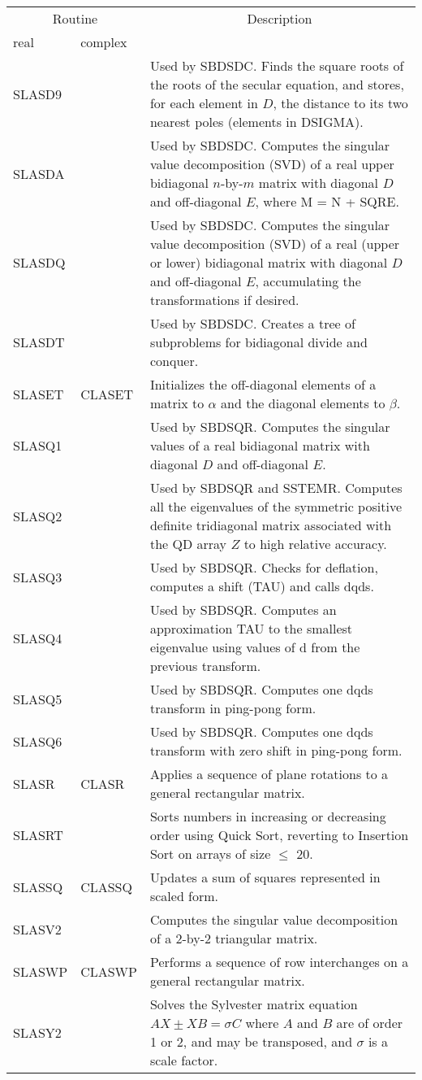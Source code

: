 \begin{center}
\begin{tabular}{| l   p{1.15in} |p{4.1in}    |}
\hline \multicolumn{2}{|c|}{Routine}&\multicolumn{1}{c|}{Description} \\ 
\cline{1-2} real&complex&\\
\hline \hline
SLASD9&&
Used by SBDSDC.  Finds the square roots of the roots of the secular
equation, and stores, for each element in $D$, the distance to its two
nearest poles (elements in DSIGMA). \\
SLASDA&&
Used by SBDSDC.  Computes the singular value decomposition (SVD) of a
real upper bidiagonal $n$-by-$m$ matrix with diagonal $D$ and off-diagonal $E$,
where M = N + SQRE. \\
SLASDQ&&
Used by SBDSDC.  Computes the singular value decomposition (SVD) of a real
(upper or lower) bidiagonal matrix with diagonal $D$ and
off-diagonal $E$, accumulating the transformations if desired. \\
SLASDT&&
Used by SBDSDC.  Creates a tree of subproblems for bidiagonal divide and
conquer.\\
SLASET&CLASET& 
Initializes the off-diagonal elements of a matrix to $\alpha$
and the diagonal elements to $\beta$.\\
SLASQ1& &
Used by SBDSQR.
Computes the singular values of a real bidiagonal
matrix with diagonal $D$ and off-diagonal $E$.   \\
SLASQ2& &
Used by SBDSQR and SSTEMR.
Computes all the eigenvalues of the symmetric positive
definite tridiagonal matrix associated with the QD array $Z$ to high
relative accuracy.\\ 
SLASQ3& &
Used by SBDSQR.
Checks for deflation, computes a shift (TAU) and calls dqds.\\
SLASQ4& &
Used by SBDSQR.
Computes an approximation TAU to the smallest eigenvalue
using values of d from the previous transform.\\
SLASQ5& &
Used by SBDSQR.
Computes one dqds transform in ping-pong form. \\
SLASQ6& &
Used by SBDSQR.
Computes one dqds transform with zero shift in ping-pong form. \\
SLASR&CLASR&
Applies a sequence of plane rotations to a general rectangular
matrix.\\
SLASRT& &
Sorts numbers in increasing or decreasing order using Quick Sort,
reverting to Insertion Sort on arrays of size $\leq$ 20.  \\
SLASSQ&CLASSQ& 
Updates a sum of squares represented in scaled form.\\
SLASV2&&
Computes the singular value decomposition of a 2-by-2 triangular matrix.\\
SLASWP&CLASWP& 
Performs a sequence of row interchanges on a general rectangular matrix.\\
SLASY2&&
Solves the Sylvester matrix equation $A X \pm X B = \sigma C$
where $A$ and $B$ are of order 1 or 2, 
and may be transposed,
and $\sigma$ is a scale factor.\\
\hline
\end{tabular}
\end{center}


